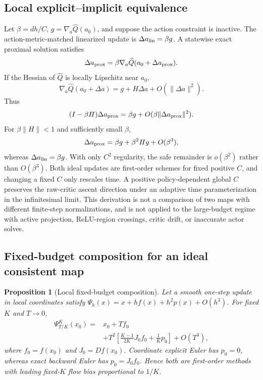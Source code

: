 \documentclass[twoside]{article}
\newtheorem{proposition}{Proposition}
\begin{document}
\subsection{Local explicit--implicit equivalence}
Let $\beta=dh/C$, $g=\nabla_a\widehat Q(a_0)$, and suppose the action
constraint is inactive. The action-metric-matched linearized update is
$\Delta a_{\rm lin}=\beta g$. A statewise exact proximal solution satisfies
\begin{equation}
\Delta a_{\rm prox}
=\beta\nabla_a\widehat Q(a_0+\Delta a_{\rm prox}).
\end{equation}
If the Hessian of $\widehat Q$ is locally Lipschitz near $a_0$,
\begin{equation}
\nabla_a\widehat Q(a_0+\Delta a)
=g+H\Delta a+O(\|\Delta a\|^2).
\end{equation}
Thus
\begin{equation}
(I-\beta H)\Delta a_{\rm prox}
=\beta g+O(\beta\|\Delta a_{\rm prox}\|^2).
\end{equation}
For $\beta\|H\|<1$ and sufficiently small $\beta$,
\begin{equation}
\Delta a_{\rm prox}=\beta g+\beta^2Hg+O(\beta^3),
\end{equation}
whereas $\Delta a_{\rm lin}=\beta g$. With only $C^2$ regularity, the safe
remainder is $o(\beta^2)$ rather than $O(\beta^3)$. Both ideal updates are
first-order schemes for fixed positive $C$, and changing a fixed $C$ only
rescales time. A positive
policy-dependent global $C$ preserves the raw-critic ascent direction under an
adaptive time parameterization in the infinitesimal limit. This derivation is
not a comparison of two maps with different finite-step normalizations, and is
not applied to the large-budget regime with active projection, ReLU-region
crossings, critic drift, or inaccurate actor solves.

\subsection{Fixed-budget composition for an ideal consistent map}
\begin{proposition}[Local fixed-budget composition]
\label{prop:local_composition}
Let a smooth one-step update in local coordinates satisfy
$\Psi_h(x)=x+h f(x)+h^2p(x)+O(h^3)$. For fixed $K$ and $T\to0$,
\begin{equation}
\begin{aligned}
\Psi_{T/K}^{K}(x_0)
={}&x_0+Tf_0\\
&+T^2\!\left[\frac{K-1}{2K}J_0f_0+\frac{1}{K}p_0\right]+O(T^3),
\end{aligned}
\label{eq:k_comp}
\end{equation}
where $f_0=f(x_0)$ and $J_0=Df(x_0)$. Coordinate explicit Euler has
$p_0=0$, whereas exact backward Euler has $p_0=J_0f_0$. Hence both are
first-order methods with leading fixed-$K$ flow bias proportional to $1/K$.
\end{proposition}
\end{document}
